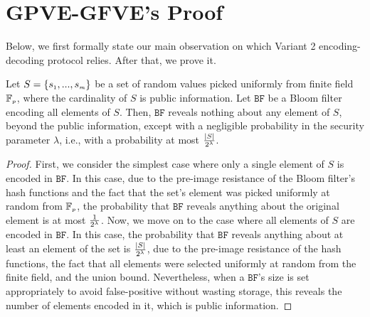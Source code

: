 

\vspace{-1mm}
\section{GPVE-GFVE's Proof}\label{sec::Variant-2-Theorem-proof}
\vspace{-1mm}

Below, we first formally state our main observation on which Variant 2 encoding-decoding protocol relies. After that, we prove it.

\vspace{-1mm}
\begin{theorem}
Let  $S=\{s_{\scriptscriptstyle 1},..., s_{\scriptscriptstyle m}\}$ be a set of random values picked uniformly from finite field $\mathbb{F}_{\scriptscriptstyle p}$, where the cardinality of $S$ is public information. Let $\mathtt{BF}$ be a Bloom filter encoding all elements of   $S$. Then,  $\mathtt{BF}$ reveals nothing about any element of $S$, beyond the public information, except with a negligible probability in the security parameter $\lambda$, i.e., with a probability at most $\frac{|S|}{2^{\scriptscriptstyle \lambda}}$. 
\end{theorem}

\vspace{-4.5mm}
\begin{proof}
First, we consider the simplest case where only a single element of $S$ is encoded in $\mathtt{BF}$. In this case, due to the pre-image resistance of the Bloom filter's hash functions and the fact that the set's element was picked uniformly at random from $\mathbb{F}_{\scriptscriptstyle p}$, the probability that $\mathtt{BF}$ reveals anything about the original element is at most $\frac{1}{2^{\scriptscriptstyle \lambda}}$. Now, we move on to the case where all elements of $S$ are encoded in $\mathtt{BF}$. In this case, the probability that $\mathtt{BF}$ reveals anything about at least an element of the set is $\frac{|S|}{2^{\scriptscriptstyle \lambda}}$, due to the pre-image resistance of the hash functions,  the fact that all elements were selected uniformly at random from the finite field, and the union bound. Nevertheless, when a $\mathtt{BF}$'s size is set appropriately to avoid false-positive without wasting storage, this reveals the number of elements encoded in it, which is public information.  %
\end{proof}

